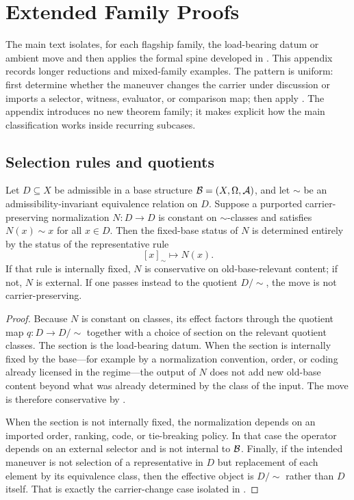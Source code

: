 \section{Extended Family Proofs}\label{app:extended-cases}

The main text isolates, for each flagship family, the load-bearing datum or ambient move and then applies the formal spine developed in . This appendix records longer reductions and mixed-family examples. The pattern is uniform: first determine whether the maneuver changes the carrier under discussion or imports a selector, witness, evaluator, or comparison map; then apply . The appendix introduces no new theorem family; it makes explicit how the main classification works inside recurring subcases.

\subsection{Selection rules and quotients}

\begin{proposition}\label{prop:app-representatives}
Let $D\subseteq X$ be admissible in a base structure $\mathcal{B}=(X,\Omega,\mathcal{A})$, and let $\sim$ be an admissibility-invariant equivalence relation on $D$. Suppose a purported carrier-preserving normalization $N:D\to D$ is constant on $\sim$-classes and satisfies $N(x)\sim x$ for all $x\in D$. Then the fixed-base status of $N$ is determined entirely by the status of the representative rule
\[
[x]_{\sim}\longmapsto N(x).
\]
If that rule is internally fixed, $N$ is conservative on old-base-relevant content; if not, $N$ is external. If one passes instead to the quotient $D/{\sim}$, the move is not carrier-preserving.
\end{proposition}

\begin{proof}
Because $N$ is constant on classes, its effect factors through the quotient map $q:D\to D/{\sim}$ together with a choice of section on the relevant quotient classes. The section is the load-bearing datum. When the section is internally fixed by the base---for example by a normalization convention, order, or coding already licensed in the regime---the output of $N$ does not add new old-base content beyond what was already determined by the class of the input. The move is therefore conservative by .

When the section is not internally fixed, the normalization depends on an imported order, ranking, code, or tie-breaking policy. In that case the operator depends on an external selector and is not internal to $\mathcal{B}$. Finally, if the intended maneuver is not selection of a representative in $D$ but replacement of each element by its equivalence class, then the effective object is $D/{\sim}$ rather than $D$ itself. That is exactly the carrier-change case isolated in .
\end{proof}

